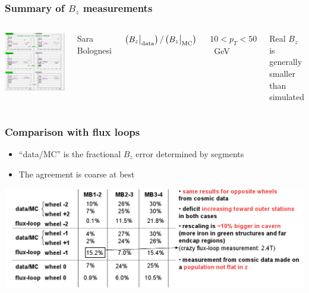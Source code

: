 \documentclass[compress]{beamer}
\begin{document}
\begin{frame}
\frametitle{Summary of $B_z$ measurements}
\begin{columns}
\includegraphics[width=\linewidth]{ugo_analysis2.png}

{\tiny Sara Bolognesi} 

\vspace{1.25 cm}
$\left(B_z\big|_{\mbox{\scriptsize data}}\right) / \left(B_z\big|_{\mbox{\scriptsize MC}}\right)$

\vspace{0.5 cm}
\mbox{$10 < p_T < 50$~GeV\hspace{-1 cm}}

\vspace{0.5 cm}
Real $B_z$ is generally smaller than simulated

\vspace{3.25 cm}
\end{columns}
\end{frame}

\begin{frame}
\frametitle{Comparison with flux loops}

\begin{itemize}
\item ``data/MC'' is the fractional $B_z$ error determined by segments
\item The agreement is coarse at best
\end{itemize}

\vfill
\includegraphics[width=\linewidth]{flux_loop_table.png}
\end{frame}
\end{document}
